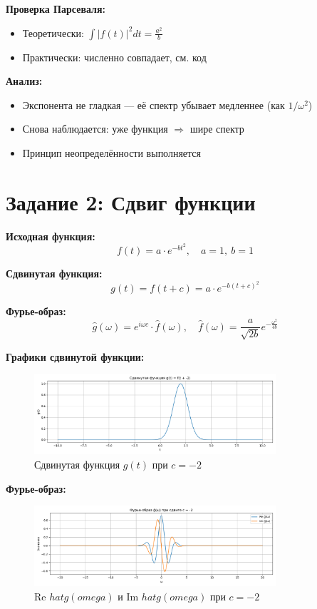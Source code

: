 \textbf{Проверка Парсеваля:}

\begin{itemize}
    \item Теоретически: $\displaystyle \int |f(t)|^2 dt = \frac{a^2}{b}$
    \item Практически: численно совпадает, см. код
\end{itemize}

\textbf{Анализ:}

\begin{itemize}
    \item Экспонента не гладкая — её спектр убывает медленнее (как $1/\omega^2$)
    \item Снова наблюдается: уже функция $\Rightarrow$ шире спектр
    \item Принцип неопределённости выполняется
\end{itemize}

\section*{Задание 2: Сдвиг функции}

\textbf{Исходная функция:}
\[
f(t) = a \cdot e^{-b t^2}, \quad a = 1, \ b = 1
\]

\textbf{Сдвинутая функция:}
\[
g(t) = f(t + c) = a \cdot e^{-b (t + c)^2}
\]

\textbf{Фурье-образ:}
\[
\hat{g}(\omega) = e^{i \omega c} \cdot \hat{f}(\omega), \quad \hat{f}(\omega) = \frac{a}{\sqrt{2b}} e^{-\frac{\omega^2}{4b}}
\]

\textbf{Графики сдвинутой функции:}

\begin{figure}[h!]
    \centering
    \includegraphics[width=0.8\textwidth]{g_function_c-2.png}
    \caption{Сдвинутая функция $g(t)$ при $c = -2$}
\end{figure}

\textbf{Фурье-образ:}

\begin{figure}[h!]
    \centering
    \includegraphics[width=0.8\textwidth]{g_hat_complex_c-2.png}
    \caption{Re $hat{g}(omega)$ и Im $hat{g}(omega)$ при $c = -2$}
\end{figure}

